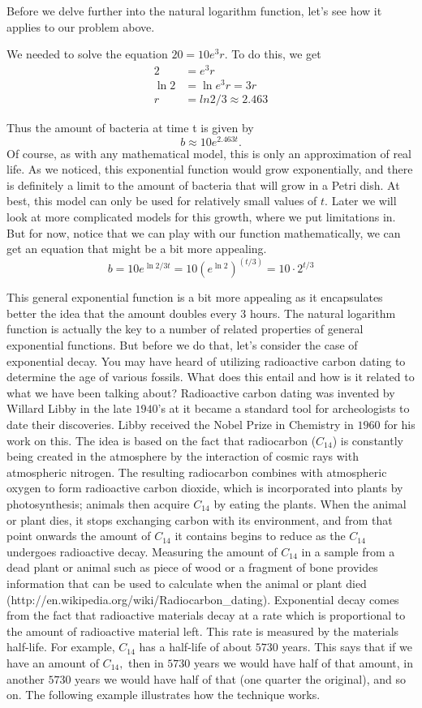 Before we delve further into the natural logarithm function, let's see
how it applies to our problem above. 

We needed to solve the equation $20=10e^3r.$  To do this, we get
\begin{align*}
2&=e^3r\\
\ln 2&=\ln e^3r =3r\\
r&=ln2/3 \approx 2.463
\end{align*}

Thus the amount of bacteria at time t is given by 
$$
b\approx 10e^{2.463t}.
$$
Of course, as with any mathematical model, this is only an
approximation of real life.  As we noticed, this exponential function
would grow exponentially, and there is definitely a limit to the
amount of bacteria that will grow in a Petri dish.  At best, this
model can only be used for relatively small values of $t.$  Later we
will look at more complicated models for this growth, where we put
limitations in.  But for now, notice that we can play with our
function mathematically, we can get an equation that might be a bit
more appealing.
$$
b=10e^{\ln2/3 t}=10\left(e^{\ln 2}\right)^(t/3)=10\cdot2^{t/3}
$$

This general exponential function is a bit more appealing as it
encapsulates better the idea that the amount doubles every $3$ hours.
The natural logarithm function is actually the key to a number of
related properties of general exponential functions.  But before we do
that, let's consider the case of exponential decay.  You may have
heard of utilizing radioactive carbon dating to determine the age of
various fossils.  What does this entail and how is it related to what
we have been talking about?  Radioactive carbon dating was invented by
Willard Libby in the late $1940$'s at it became a standard tool for
archeologists to date their discoveries.  Libby received the Nobel
Prize in Chemistry in $1960$ for his work on this.  The idea is based on
the fact that radiocarbon ($C_{14}$) is constantly being created in the
atmosphere by the interaction of cosmic rays with atmospheric
nitrogen. The resulting radiocarbon combines with atmospheric oxygen
to form radioactive carbon dioxide, which is incorporated into plants
by photosynthesis; animals then acquire $C_{14}$ by eating the plants. When
the animal or plant dies, it stops exchanging carbon with its
environment, and from that point onwards the amount of $C_{14}$ it contains
begins to reduce as the $C_{14}$ undergoes radioactive decay. Measuring the
amount of $C_{14}$ in a sample from a dead plant or animal such as piece of
wood or a fragment of bone provides information that can be used to
calculate when the animal or plant died 
(http://en.wikipedia.org/wiki/Radiocarbon\_dating).  Exponential decay
comes from the fact that radioactive materials decay at a rate which
is proportional to the amount of radioactive material left.  This rate
is measured by the materials half-life.  For example, $C_{14}$ has a
half-life of about $5730$ years.  This says that if we have an amount of
$C_{14},$ then in $5730$ years we would have half of that amount, in another
$5730$ years we would have half of that (one quarter the original), and
so on.  The following example illustrates how the technique works.

